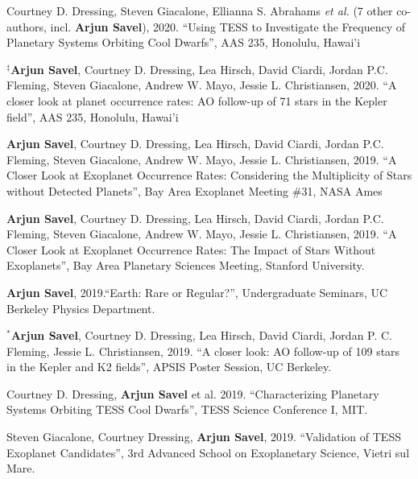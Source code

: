 \documentclass[12pt,letterpaper]{article}
\begin{document}
\begin{list}{}{\cvlist}

\item[{\color{numcolor}\scriptsize8}] Courtney D. Dressing, Steven Giacalone, Ellianna S. Abrahams \emph{et al.} (7 other co-authors, incl. \textbf{Arjun Savel}), 2020. ``Using TESS to Investigate the Frequency of Planetary Systems Orbiting Cool Dwarfs'', AAS 235, Honolulu, Hawai'i

\item[{\color{numcolor}\scriptsize7}] $^\ddagger$\textbf{Arjun Savel}, Courtney D. Dressing, Lea Hirsch, David Ciardi, Jordan P.C. Fleming, Steven Giacalone, Andrew W. Mayo, Jessie L. Christiansen, 2020. “A closer look at planet occurrence rates: AO follow-up of 71 stars in the Kepler field”, AAS 235, Honolulu, Hawai'i

\item[{\color{numcolor}\scriptsize6}] \textbf{Arjun Savel}, Courtney D. Dressing, Lea Hirsch, David Ciardi, Jordan P.C. Fleming, Steven Giacalone, Andrew W. Mayo, Jessie L. Christiansen, 2019. “A Closer Look at Exoplanet Occurrence Rates: Considering the Multiplicity of Stars without Detected Planets”, Bay Area Exoplanet Meeting \#31, NASA Ames

\item[{\color{numcolor}\scriptsize5}] \textbf{Arjun Savel}, Courtney D. Dressing, Lea Hirsch, David Ciardi, Jordan P.C. Fleming, Steven Giacalone, Andrew W. Mayo, Jessie L. Christiansen, 2019. “A Closer Look at Exoplanet Occurrence Rates: The Impact of Stars Without Exoplanets”, Bay Area Planetary Sciences Meeting, Stanford University.

\item[{\color{numcolor}\scriptsize4}] \textbf{Arjun Savel}, 2019.“Earth: Rare or Regular?”, Undergraduate Seminars, UC Berkeley Physics Department.

\item[{\color{numcolor}\scriptsize3}] $^*$\textbf{Arjun Savel}, Courtney D. Dressing, Lea Hirsch, David Ciardi, Jordan P. C. Fleming, Jessie L. Christiansen, 2019. “A closer look: AO follow-up of 109 stars in the Kepler and K2 fields”, APSIS Poster Session, UC Berkeley.

\item[{\color{numcolor}\scriptsize2}] Courtney D. Dressing, \textbf{Arjun Savel} et al. 2019. “Characterizing Planetary Systems Orbiting TESS Cool Dwarfs”, TESS Science Conference I, MIT.

\item[{\color{numcolor}\scriptsize1}] Steven Giacalone, Courtney Dressing, \textbf{Arjun Savel}, 2019. “Validation of TESS Exoplanet Candidates”, 3rd Advanced School on Exoplanetary Science, Vietri sul Mare.

\end{list}
\end{document}
